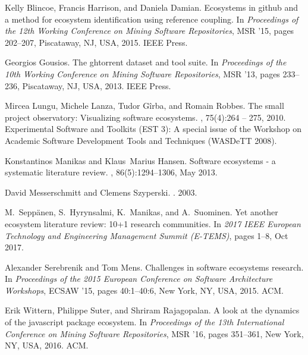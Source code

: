 \documentclass[10pt,conference]{IEEEtran}
\begin{document}
\begin{thebibliography}{00}

  Kelly Blincoe, Francis Harrison, and Daniela Damian.
  \newblock Ecosystems in github and a method for ecosystem identification using
    reference coupling.
  \newblock In {\em Proceedings of the 12th Working Conference on Mining Software
    Repositories}, MSR '15, pages 202--207, Piscataway, NJ, USA, 2015. IEEE
    Press.
  
  Georgios Gousios.
  \newblock The ghtorrent dataset and tool suite.
  \newblock In {\em Proceedings of the 10th Working Conference on Mining Software
    Repositories}, MSR '13, pages 233--236, Piscataway, NJ, USA, 2013. IEEE
    Press.
  
  Mircea Lungu, Michele Lanza, Tudor Gîrba, and Romain Robbes.
  \newblock The small project observatory: Visualizing software ecosystems.
  , 75(4):264 -- 275, 2010.
  \newblock Experimental Software and Toolkits (EST 3): A special issue of the
    Workshop on Academic Software Development Tools and Techniques (WASDeTT
    2008).
  
  Konstantinos Manikas and Klaus~Marius Hansen.
  \newblock Software ecosystems - a systematic literature review.
  , 86(5):1294--1306, May 2013.
  
  David Messerschmitt and Clemens Szyperski.
  .
   2003.
  
  M.~{Seppänen}, S.~{Hyrynsalmi}, K.~{Manikas}, and A.~{Suominen}.
  \newblock Yet another ecosystem literature review: 10+1 research communities.
  \newblock In {\em 2017 IEEE European Technology and Engineering Management
    Summit (E-TEMS)}, pages 1--8, Oct 2017.
  
  Alexander Serebrenik and Tom Mens.
  \newblock Challenges in software ecosystems research.
  \newblock In {\em Proceedings of the 2015 European Conference on Software
    Architecture Workshops}, ECSAW '15, pages 40:1--40:6, New York, NY, USA,
    2015. ACM.
  
  Erik Wittern, Philippe Suter, and Shriram Rajagopalan.
  \newblock A look at the dynamics of the javascript package ecosystem.
  \newblock In {\em Proceedings of the 13th International Conference on Mining
    Software Repositories}, MSR '16, pages 351--361, New York, NY, USA, 2016.
    ACM.
  
  \end{thebibliography}
  
\vspace{12pt}
\end{document}
